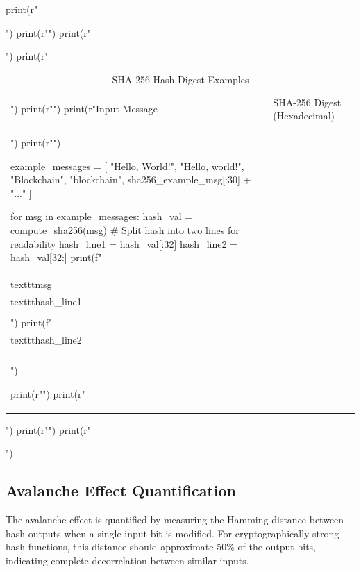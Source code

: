 \documentclass[a4paper, 11pt]{article}
\begin{document}
\begin{pycode}
print(r"\begin{table}[htbp]")
print(r"\centering")
print(r"\caption{SHA-256 Hash Digest Examples}")
print(r"\begin{tabular}{p{5cm}p{8cm}}")
print(r"\toprule")
print(r"Input Message & SHA-256 Digest (Hexadecimal) \\")
print(r"\midrule")

example_messages = [
    "Hello, World!",
    "Hello, world!",
    "Blockchain",
    "blockchain",
    sha256_example_msg[:30] + "..."
]

for msg in example_messages:
    hash_val = compute_sha256(msg)
    # Split hash into two lines for readability
    hash_line1 = hash_val[:32]
    hash_line2 = hash_val[32:]
    print(f"\\texttt{{{msg}}} & \\texttt{{{hash_line1}}} \\\\")
    print(f"& \\texttt{{{hash_line2}}} \\\\[0.5em]")

print(r"\bottomrule")
print(r"\end{tabular}")
print(r"\label{tab:sha256_examples}")
print(r"\end{table}")
\end{pycode}

\subsection{Avalanche Effect Quantification}

The avalanche effect is quantified by measuring the Hamming distance between hash outputs
when a single input bit is modified. For cryptographically strong hash functions, this
distance should approximate 50\% of the output bits, indicating complete decorrelation
between similar inputs.
\end{document}
